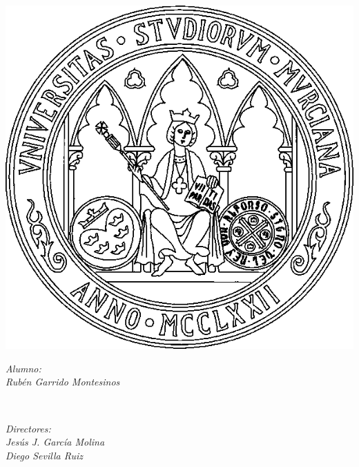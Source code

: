 \documentclass[12pt,twoside,openany]{report}     %
\begin{document}
\begin{titlepage}
                \includegraphics[scale = 0.3]{Imagenes/escudoum.png}\\[2cm] %


                \begin{minipage}{0.5\textwidth}
                        \begin{flushleft} \large
                                \emph{Alumno:}\\
                                \emph{Rubén Garrido Montesinos}
                        \end{flushleft}
                \end{minipage}
                ~
                \begin{minipage}{0.45\textwidth}
                        \begin{flushright} \large
                                \emph{Directores:} \\
                                \emph{Jesús J. García Molina}\\
                                \emph{Diego Sevilla Ruiz}
                        \end{flushright}
                \end{minipage}\\[1.5cm]


\end{titlepage}
\end{document}
